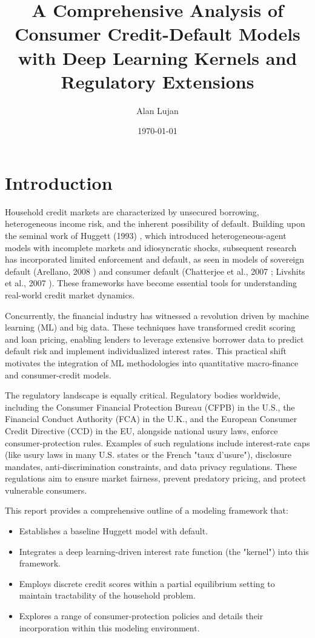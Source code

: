 \documentclass[acmsmall]{acmart}
\title{A Comprehensive Analysis of Consumer Credit-Default Models with Deep Learning Kernels and Regulatory Extensions}
\author{Alan Lujan}
\date{\today}
\begin{document}
\maketitle




\section*{Introduction}

Household credit markets are characterized by unsecured borrowing, heterogeneous income risk, and the inherent possibility of default. Building upon the seminal work of Huggett (1993) \cite{Huggett1993}, which introduced heterogeneous-agent models with incomplete markets and idiosyncratic shocks, subsequent research has incorporated limited enforcement and default, as seen in models of sovereign default (Arellano, 2008 \cite{Arellano2008}) and consumer default (Chatterjee et al., 2007 \cite{Chatterjee2007}; Livshits et al., 2007 \cite{Livshits2007}). These frameworks have become essential tools for understanding real-world credit market dynamics.

Concurrently, the financial industry has witnessed a revolution driven by machine learning (ML) and big data. These techniques have transformed credit scoring and loan pricing, enabling lenders to leverage extensive borrower data to predict default risk and implement individualized interest rates. This practical shift motivates the integration of ML methodologies into quantitative macro-finance and consumer-credit models.

The regulatory landscape is equally critical. Regulatory bodies worldwide, including the Consumer Financial Protection Bureau (CFPB) in the U.S., the Financial Conduct Authority (FCA) in the U.K., and the European Consumer Credit Directive (CCD) in the EU, alongside national usury laws, enforce consumer-protection rules. Examples of such regulations include interest-rate caps (like usury laws in many U.S. states or the French "taux d’usure"), disclosure mandates, anti-discrimination constraints, and data privacy regulations. These regulations aim to ensure market fairness, prevent predatory pricing, and protect vulnerable consumers.

This report provides a comprehensive outline of a modeling framework that:
\begin{itemize}
    \item Establishes a baseline Huggett model with default.
    \item Integrates a deep learning-driven interest rate function (the "kernel") into this framework.
    \item Employs discrete credit scores within a partial equilibrium setting to maintain tractability of the household problem.
    \item Explores a range of consumer-protection policies and details their incorporation within this modeling environment.
\end{itemize}
\end{document}
